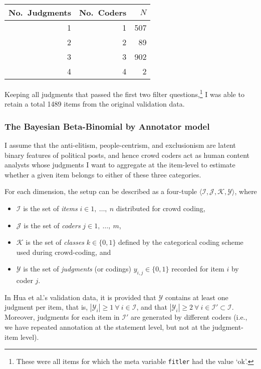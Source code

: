 \documentclass[]{article}
\providecommand{\tightlist}{%
  \setlength{\itemsep}{0pt}\setlength{\parskip}{0pt}}
\let\rmarkdownfootnote\footnote%
\def\footnote{\protect\rmarkdownfootnote}
\begin{document}
\begin{longtable}[]{@{}rrr@{}}
\toprule
No.~Judgments & No.~Coders & \(N\)\tabularnewline
\midrule
\endhead
1 & 1 & 507\tabularnewline
2 & 2 & 89\tabularnewline
3 & 3 & 902\tabularnewline
4 & 4 & 2\tabularnewline
\bottomrule
\end{longtable}

Keeping all judgments that passed the first two filter
questions,\footnote{These were all items for which the meta variable
  \texttt{fitler} had the value `ok'.} I was able to retain a total 1489
items from the original validation data.

\hypertarget{the-bayesian-beta-binomial-by-annotator-model}{%
\subsubsection{The Bayesian Beta-Binomial by Annotator
model}\label{the-bayesian-beta-binomial-by-annotator-model}}

I assume that the anti-elitism, people-centrism, and exclusionism are
latent binary features of political posts, and hence crowd coders act as
human content analysts whose judgments I want to aggregate at the
item-level to estimate whether a given item belongs to either of these
three categories.

For each dimension, the setup can be described as a four-tuple
\(\langle\mathcal{I}, \mathcal{J}, \mathcal{K}, \mathcal{Y}\rangle\),
where

\begin{itemize}
\tightlist
\item
  \(\mathcal{I}\) is the set of \emph{items} \(i \in 1,\ \ldots ,\ n\)
  distributed for crowd coding,
\item
  \(\mathcal{J}\) is the set of \emph{coders} \(j \in 1,\ \ldots ,\ m\),
\item
  \(\mathcal{K}\) is the set of \emph{classes} \(k \in \{0, 1\}\)
  defined by the categorical coding scheme used during crowd-coding, and
\item
  \(\mathcal{Y}\) is the set of \emph{judgments} (or codings)
  \(y_{i,j} \in \{0, 1\}\) recorded for item \(i\) by coder \(j\).
\end{itemize}

In Hua et al.'s validation data, it is provided that \(\mathcal{Y}\)
contains at least one judgment per item, that is,
\(|\mathcal{Y}_i| \geq 1\ \forall\ i \in \mathcal{I}\), and that
\(|\mathcal{Y}_i| \geq 2\ \forall\ i \in \mathcal{I}' \subset \mathcal{I}\).
Moreover, judgments for each item in \(\mathcal{I}'\) are generated by
different coders (i.e., we have repeated annotation at the statement
level, but not at the judgment-item level).
\end{document}

